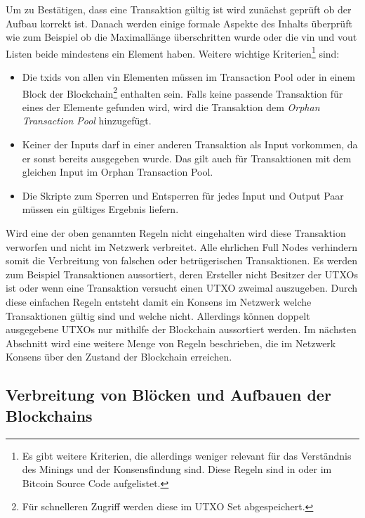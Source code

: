\documentclass[ngerman,runningheads,a4paper]{llncs}[2018/03/10]
\begin{document}
Um zu Bestätigen, dass eine Transaktion gültig ist wird zunächst geprüft ob der Aufbau korrekt ist. Danach werden einige formale Aspekte des Inhalts überprüft wie zum Beispiel ob die Maximallänge überschritten wurde oder die vin und vout Listen beide mindestens ein Element haben. Weitere wichtige Kriterien\footnote{Es gibt weitere Kriterien, die allerdings weniger relevant für das Verständnis des Minings und der Konsensfindung sind. Diese Regeln sind in \citep{bitcoinbook} oder im Bitcoin Source Code \citep{bitcoincore} aufgelistet.} sind:

\begin{itemize}

\item Die txids von allen vin Elementen müssen im Transaction Pool oder in einem Block der Blockchain\footnote{Für schnelleren Zugriff werden diese im UTXO Set abgespeichert.} enthalten sein. Falls keine passende Transaktion für eines der Elemente gefunden wird, wird die Transaktion dem \textit{Orphan Transaction Pool} hinzugefügt.

\item Keiner der Inputs darf in einer anderen Transaktion als Input vorkommen, da er sonst bereits ausgegeben wurde. Das gilt auch für Transaktionen mit dem gleichen Input im Orphan Transaction Pool.

\item Die Skripte zum Sperren und Entsperren für jedes Input und Output Paar müssen ein gültiges Ergebnis liefern.

\end{itemize}

Wird eine der oben genannten Regeln nicht eingehalten wird diese Transaktion verworfen und nicht im Netzwerk verbreitet. Alle ehrlichen Full Nodes verhindern somit die Verbreitung von falschen oder betrügerischen Transaktionen. Es werden zum Beispiel Transaktionen aussortiert, deren Ersteller nicht Besitzer der UTXOs ist oder wenn eine Transaktion versucht einen UTXO zweimal auszugeben. Durch diese einfachen Regeln entsteht damit ein Konsens im Netzwerk welche Transaktionen gültig sind und welche nicht. Allerdings können doppelt ausgegebene UTXOs nur mithilfe der Blockchain aussortiert werden. Im nächsten Abschnitt wird eine weitere Menge von Regeln beschrieben, die im Netzwerk Konsens über den Zustand der Blockchain erreichen.

\subsection{Verbreitung von Blöcken und Aufbauen der Blockchains}\label{sec:blockverbreitung}
\end{document}
